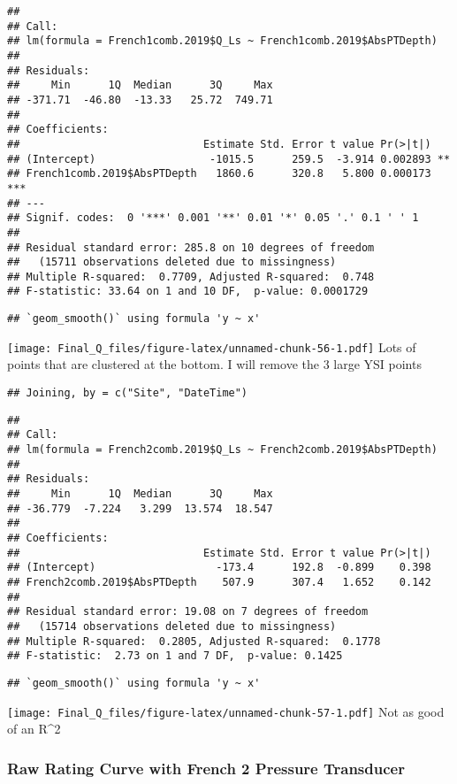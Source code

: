 \documentclass[
]{article}
\begin{document}
\begin{verbatim}
## 
## Call:
## lm(formula = French1comb.2019$Q_Ls ~ French1comb.2019$AbsPTDepth)
## 
## Residuals:
##     Min      1Q  Median      3Q     Max 
## -371.71  -46.80  -13.33   25.72  749.71 
## 
## Coefficients:
##                             Estimate Std. Error t value Pr(>|t|)    
## (Intercept)                  -1015.5      259.5  -3.914 0.002893 ** 
## French1comb.2019$AbsPTDepth   1860.6      320.8   5.800 0.000173 ***
## ---
## Signif. codes:  0 '***' 0.001 '**' 0.01 '*' 0.05 '.' 0.1 ' ' 1
## 
## Residual standard error: 285.8 on 10 degrees of freedom
##   (15711 observations deleted due to missingness)
## Multiple R-squared:  0.7709, Adjusted R-squared:  0.748 
## F-statistic: 33.64 on 1 and 10 DF,  p-value: 0.0001729
\end{verbatim}

\begin{verbatim}
## `geom_smooth()` using formula 'y ~ x'
\end{verbatim}

\texttt{[image: Final\_Q\_files/figure-latex/unnamed-chunk-56-1.pdf]} Lots
of points that are clustered at the bottom. I will remove the 3 large
YSI points

\begin{verbatim}
## Joining, by = c("Site", "DateTime")
\end{verbatim}

\begin{verbatim}
## 
## Call:
## lm(formula = French2comb.2019$Q_Ls ~ French2comb.2019$AbsPTDepth)
## 
## Residuals:
##     Min      1Q  Median      3Q     Max 
## -36.779  -7.224   3.299  13.574  18.547 
## 
## Coefficients:
##                             Estimate Std. Error t value Pr(>|t|)
## (Intercept)                   -173.4      192.8  -0.899    0.398
## French2comb.2019$AbsPTDepth    507.9      307.4   1.652    0.142
## 
## Residual standard error: 19.08 on 7 degrees of freedom
##   (15714 observations deleted due to missingness)
## Multiple R-squared:  0.2805, Adjusted R-squared:  0.1778 
## F-statistic:  2.73 on 1 and 7 DF,  p-value: 0.1425
\end{verbatim}

\begin{verbatim}
## `geom_smooth()` using formula 'y ~ x'
\end{verbatim}

\texttt{[image: Final\_Q\_files/figure-latex/unnamed-chunk-57-1.pdf]} Not
as good of an R\^{}2

\hypertarget{raw-rating-curve-with-french-2-pressure-transducer}{%
\subsubsection{Raw Rating Curve with French 2 Pressure
Transducer}\label{raw-rating-curve-with-french-2-pressure-transducer}}
\end{document}
